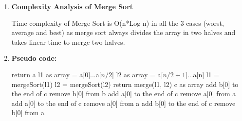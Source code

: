 \documentclass[11pt,a4paper]{article}
\begin{document}
{\begin{enumerate}[label=\textbf{\arabic*})]
					Merge Sort is a Divide and Conquer algorithm. It divides the input array into two halves, calls itself for the two halves, and then it merges the two sorted halves. The merge() function is used for merging two halves. The merge(arr, l, m, r) is a key process that assumes that arr[l..m] and arr[m+1..r] are sorted and merges the two sorted sub-arrays into one
				\\[12pt]
				\item \textbf{Complexity Analysis of Merge Sort}
    				
    				Time complexity of Merge Sort is O(n*Log n) in all the 3 cases (worst, average and best) as merge sort always divides the array in two halves and takes linear time to merge two halves.
				\\[12pt]
				\item \textbf{Pseudo code:} 
				\begin{algorithm}
            	\begin{algorithmic}[1]
            				\State return a
            			\EndIf
            			\State l1 as array = a[0]...a[$n/2$]
            			\State l2 as array = a[$n/2+1$]...a[n]
            			\State l1 = mergeSort(l1)
            			\State l2 = mergeSort(l2)
            			\State return merge(l1, l2)
            		\EndProcedure
            		\vspace{12pt}
            			\State c as array
            					\State add b[0] to the end of c
            					\State remove b[0] from b
            				\Else 
            					\State add a[0] to the end of c
            					\State remove a[0] from a
            				\EndIf
            			\EndWhile
            				\State add a[0] to the end of c
            				\State remove a[0] from a
            			\EndWhile
            				\State add b[0] to the end of c
            				\State remove b[0] from a
            			\EndWhile
            			

\end{algorithmic}
\end{algorithm}
\end{enumerate}}
\end{document}
